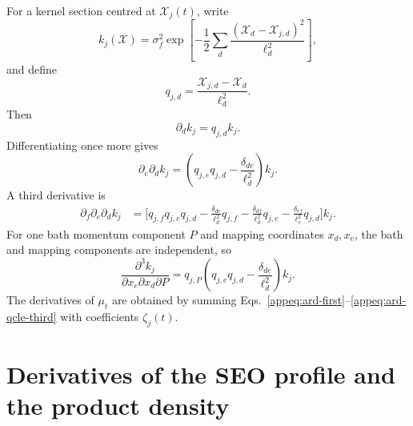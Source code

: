 \documentclass[
  11pt,
  letterpaper,
  onehalfspacing,
  normalmargins,
  equalmargins,
  oneside
]{ut-thesis}
\begin{document}
For a kernel section centred at
\(\boldsymbol{\mathcal X}_j(t)\), write
\begin{equation}
k_j(\boldsymbol{\mathcal X})
=
\sigma_f^2
\exp\left[
-\frac{1}{2}
\sum_d
\frac{
(\mathcal X_d-\mathcal X_{j,d})^2
}{
\ell_d^2
}
\right],
\label{appeq:ard-kernel}
\end{equation}
and define
\begin{equation}
q_{j,d}
=
\frac{
\mathcal X_{j,d}-\mathcal X_d
}{
\ell_d^2
}.
\label{appeq:ard-q-definition}
\end{equation}
Then
\begin{equation}
\partial_d k_j
=
q_{j,d}k_j.
\label{appeq:ard-first}
\end{equation}
Differentiating once more gives
\begin{equation}
\partial_e\partial_d k_j
=
\left(
q_{j,e}q_{j,d}
-
\frac{\delta_{de}}{\ell_d^2}
\right)
k_j.
\label{appeq:ard-second}
\end{equation}
A third derivative is
\begin{align}
\partial_f\partial_e\partial_d k_j
&=
\Bigg[
q_{j,f}q_{j,e}q_{j,d}
-
\frac{\delta_{de}}{\ell_d^2}q_{j,f}
-
\frac{\delta_{df}}{\ell_d^2}q_{j,e}
-
\frac{\delta_{ef}}{\ell_e^2}q_{j,d}
\Bigg]
k_j.
\label{appeq:ard-third}
\end{align}
For one bath momentum component \(P\) and mapping coordinates
\(x_d,x_e\), the bath and mapping components are independent, so
\begin{equation}
\frac{\partial^3k_j}
{\partial x_e\partial x_d\partial P}
=
q_{j,P}
\left(
q_{j,e}q_{j,d}
-
\frac{\delta_{de}}{\ell_d^2}
\right)
k_j.
\label{appeq:ard-qcle-third}
\end{equation}
The derivatives of \(\mu_t\) are obtained by summing
Eqs.~\eqref{appeq:ard-first}--\eqref{appeq:ard-qcle-third} with coefficients
\(\zeta_j(t)\).

\section{Derivatives of the SEO profile and the product density}
\label{appsec:product-derivatives}
\end{document}
